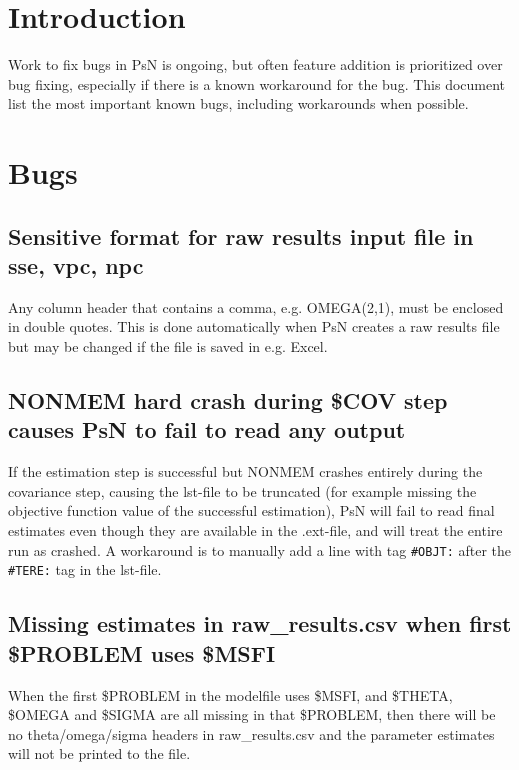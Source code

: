 




\maketitle


\section{Introduction}
Work to fix bugs in PsN is ongoing, but often feature addition is prioritized over bug fixing, especially if there is a known workaround for the bug. This document list the most important known bugs, including workarounds when possible.   

\section{Bugs}

\subsection{Sensitive format for raw results input file in sse, vpc, npc}
Any column header that contains a comma, e.g. OMEGA(2,1), must be enclosed in double quotes. This is done automatically when PsN creates a raw results file but may be changed if the file is saved in e.g. Excel.

\subsection{NONMEM hard crash during \$COV step causes PsN to fail to read any output}
If the estimation step is successful but NONMEM crashes entirely during the covariance step, causing the
lst-file to be truncated (for example missing the objective function value of the successful estimation),
PsN will fail to read final estimates even though they are available in the .ext-file, 
and will treat the entire run as crashed. A workaround is to manually add a line with tag \verb|#OBJT:| after the 
\verb|#TERE:| tag in the lst-file.

\subsection{Missing estimates in raw\_results.csv when first \$PROBLEM uses \$MSFI}
When the first \$PROBLEM in the modelfile uses \$MSFI, and \$THETA, \$OMEGA and \$SIGMA are all missing in that \$PROBLEM, then there will be no theta/omega/sigma headers in raw\_results.csv and the parameter estimates will not be printed to the file.

